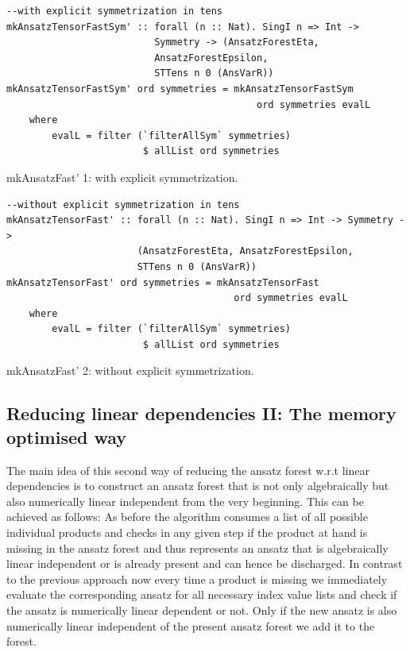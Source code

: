 \documentclass[a4paper,12pt, DIV=14, BCOR=5mm, twoside, headsepline, numbers=noenddot]{scrbook}
\begin{document}
\begin{listing}[hbt!]
\begin{verbatim}
--with explicit symmetrization in tens
mkAnsatzTensorFastSym' :: forall (n :: Nat). SingI n => Int ->
                          Symmetry -> (AnsatzForestEta,
                          AnsatzForestEpsilon,
                          STTens n 0 (AnsVarR))
mkAnsatzTensorFastSym' ord symmetries = mkAnsatzTensorFastSym
                                            ord symmetries evalL
    where
        evalL = filter (`filterAllSym` symmetries) 
                        $ allList ord symmetries
\end{verbatim} 
\caption{mkAnsatzFast' 1: with explicit symmetrization.}\label{mkAnsatzFast'1}
\end{listing}

\begin{listing}[hbt!]
\begin{verbatim}
--without explicit symmetrization in tens
mkAnsatzTensorFast' :: forall (n :: Nat). SingI n => Int -> Symmetry ->
                       (AnsatzForestEta, AnsatzForestEpsilon,
                       STTens n 0 (AnsVarR))
mkAnsatzTensorFast' ord symmetries = mkAnsatzTensorFast
                                        ord symmetries evalL
    where
        evalL = filter (`filterAllSym` symmetries) 
                        $ allList ord symmetries
\end{verbatim} 
\caption{mkAnsatzFast' 2: without explicit symmetrization.}\label{mkAnsatzFast'2}
\end{listing}

\subsection*{Reducing linear dependencies II:  The memory optimised way}

The main idea of this second way of reducing the ansatz forest w.r.t linear dependencies is to construct an ansatz forest that is not only algebraically but also numerically linear independent from the very beginning. This can be achieved as follows: As before the algorithm consumes a list of all possible individual products and checks in any given step if the product at hand is missing in the ansatz forest and thus represents an ansatz that is algebraically linear independent or is already present and can hence be discharged. In contrast to the previous approach now every time a product is missing we immediately evaluate the corresponding ansatz for all necessary index value lists and check if the ansatz is numerically linear dependent or not. Only if the new ansatz is also numerically linear independent of the present ansatz forest we add it to the forest.
\end{document}
